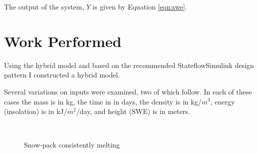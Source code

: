 \documentclass{article}
\begin{document}
The output of the system, $Y$ is given by Equation \ref{eqn:swe}.


\section{Work Performed}

Using the hybrid model and based on the recommended 
Stateflow\textregistered Simulink\textregistered
design pattern \citep{matlab2009ssdp} I constructed a
hybrid model.

Several variations on inputs were examined, two of which follow.
In each of these cases the mass is in kg, the time in in days,
the density is in kg/$m^3$, energy (insolation) is in 
kJ/$m^2$/day, and height (SWE) is in meters.

\begin{figure}
\centering
\mbox{
 \quad
{} 
}
\caption{Snow-pack consistently melting} \label{fig:consistent-melting}
\end{figure}
\end{document}

